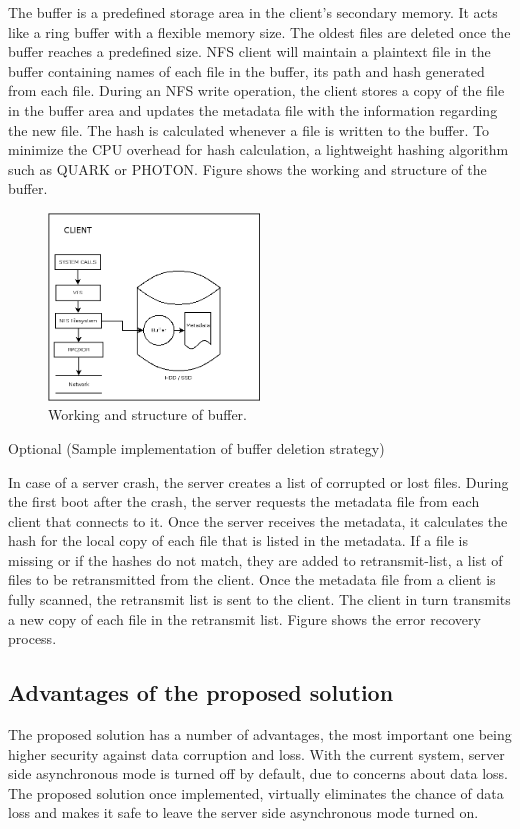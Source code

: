 \documentclass[conference]{IEEEtran}
\begin{document}
The buffer is a predefined storage area in the client's secondary memory.
It acts like a ring buffer with a flexible memory size. The oldest files are
deleted once the buffer reaches a predefined size. NFS client will maintain
a plaintext file in the buffer containing names of each file in the buffer,
its path and hash generated from each file. During an NFS write operation,
the client stores a copy of the file in the buffer area and updates the 
metadata file with the information regarding the  new file. The hash is
calculated whenever a file is written to the buffer. To minimize the CPU
overhead for hash calculation, a lightweight hashing algorithm such as QUARK
or PHOTON. Figure shows the working and structure of the buffer.
\begin{figure}[htbp]
\centerline{\includegraphics[width=0.5\textwidth,natwidth=400,natheight=50]{fixing_server_async.png}}
\caption{Working and structure of buffer.}
\label{fig}
\end{figure}

Optional (Sample implementation of buffer deletion strategy)

In case of a server crash, the server creates a list of corrupted or lost
files. During the first boot after the crash, the server requests the
metadata file from each client that connects to it. Once the server receives
the metadata, it calculates the hash for the local copy of each file that
is listed in the metadata. If a file is missing or if the hashes do not
match, they are added to retransmit-list, a list of files to be 
retransmitted from the client. Once the metadata file from a client is fully
scanned, the retransmit list is sent to the client. The client in turn
transmits a new copy of each file in the retransmit list. Figure shows the
error recovery process.

\subsection{Advantages of the proposed solution}
The proposed solution has a number of advantages, the most important one
being higher security against data corruption and loss. With the current 
system, server side asynchronous mode is turned off by default, due to 
concerns about data loss. The proposed solution once implemented, virtually
eliminates the chance of data loss and makes it safe to leave the server
side asynchronous mode turned on.
\end{document}
